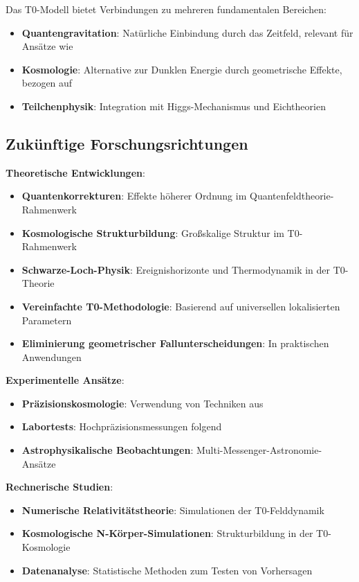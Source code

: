 \documentclass[12pt,a4paper]{article}
\begin{document}
	Das T0-Modell bietet Verbindungen zu mehreren fundamentalen Bereichen:
	\begin{itemize}
		\item \textbf{Quantengravitation}: Natürliche Einbindung durch das Zeitfeld, relevant für Ansätze wie \citep{thiemann2007,rovelli2004}
		\item \textbf{Kosmologie}: Alternative zur Dunklen Energie durch geometrische Effekte, bezogen auf \citep{weinberg2008,peebles1993}
		\item \textbf{Teilchenphysik}: Integration mit Higgs-Mechanismus und Eichtheorien \citep{weinberg2003,peskin1995}
	\end{itemize}
	
	\subsection{Zukünftige Forschungsrichtungen}
	\label{subsec:future_research}
	
	\textbf{Theoretische Entwicklungen}:
	\begin{itemize}
		\item \textbf{Quantenkorrekturen}: Effekte höherer Ordnung im Quantenfeldtheorie-Rahmenwerk
		\item \textbf{Kosmologische Strukturbildung}: Großskalige Struktur im T0-Rahmenwerk
		\item \textbf{Schwarze-Loch-Physik}: Ereignishorizonte und Thermodynamik in der T0-Theorie
		\item \textbf{Vereinfachte T0-Methodologie}: Basierend auf universellen lokalisierten Parametern
		\item \textbf{Eliminierung geometrischer Fallunterscheidungen}: In praktischen Anwendungen
	\end{itemize}
	
	\textbf{Experimentelle Ansätze}:
	\begin{itemize}
		\item \textbf{Präzisionskosmologie}: Verwendung von Techniken aus \citep{weinberg2008,planck2020}
		\item \textbf{Labortests}: Hochpräzisionsmessungen folgend \citep{will2014}
		\item \textbf{Astrophysikalische Beobachtungen}: Multi-Messenger-Astronomie-Ansätze \citep{abbott2017}
	\end{itemize}
	
	\textbf{Rechnerische Studien}:
	\begin{itemize}
		\item \textbf{Numerische Relativitätstheorie}: Simulationen der T0-Felddynamik
		\item \textbf{Kosmologische N-Körper-Simulationen}: Strukturbildung in der T0-Kosmologie
		\item \textbf{Datenanalyse}: Statistische Methoden zum Testen von Vorhersagen
	\end{itemize}
	
\end{document}

